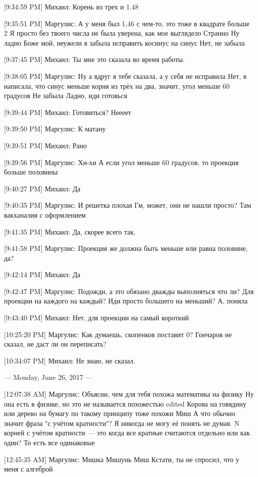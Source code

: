 \documentclass{article}
\begin{document}
[9:34:59 PM] Михаил:
Корень из трех и 1.48

[9:35:51 PM] Маргулис:
А у меня был 1,46 с чем-то, это тоже в квадрате больше 2
 Я просто без твоего числа не была уверена, как мое выглядело
 Странно
 Ну ладно
 Боже мой, неужели я забыла исправить косинус на синус
 Нет, не забыла

[9:37:45 PM] Михаил:
Ты мне это сказала во время работы.

[9:38:05 PM] Маргулис:
Ну а вдруг я тебе сказала, а у себя не исправила
 Нет, я написала, что синус меньше корня из трёх на два, значит, угол меньше 60 градусов
 Не забыла
 Ладно, иди готовься

[9:39:44 PM] Михаил:
Готовиться?
 Неееет

[9:39:50 PM] Маргулис:
К матану

[9:39:51 PM] Михаил:
Рано

[9:39:56 PM] Маргулис:
Хи-хи
 А если угол меньше 60 градусов, то проекция больше половины

[9:40:27 PM] Михаил:
Да

[9:40:35 PM] Маргулис:
И решетка плохая
 Гм, может, они не нашли просто? Там вакханалия с оформлением

[9:41:35 PM] Михаил:
Да, скорее всего так.

[9:41:58 PM] Маргулис:
Проекция же должна быть меньше или равна половине, да?

[9:42:14 PM] Михаил:
Да

[9:42:47 PM] Маргулис:
Подожди, а это обязано дважды выполняться что ли?
 Для проекции на каждого на каждый?
 Иди просто большего на меньший?
 А, поняла

[9:43:40 PM] Михаил:
Нет, для проекции на самый короткий

[10:25:20 PM] Маргулис:
Как думаешь, скопенков поставит 0?
 Гончаров не сказал, не даст ли он переписать?

[10:34:07 PM] Михаил:
Не знаю, не сказал.

--- Monday, June 26, 2017 ---

[12:07:38 AM] Маргулис:
Объясни, чем для тебя похожа математика на физику
 Ну она есть в физике, но это не называется похожестью
edited 
Корова на говядину или дерево на бумагу по такому принципу тоже похожи
 Миш
 А что обычно значит фраза "с учётом кратности"? Я никогда не могу её понять не думая. N корней с учётом кратности — это когда все кратные считаются отдельно или как один?
 То есть все одинаковые

[12:45:35 AM] Маргулис:
Мишка
 Мишунь
 Миш
 Кстати, ты не спросил, что у меня с алгеброй
\end{document}
